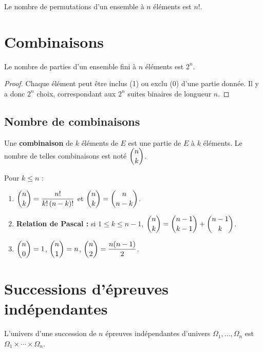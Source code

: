 \documentclass[11pt,a4paper,openany]{book}
\theoremstyle{definition}
\begin{document}
    \begin{Propriété}
        Le nombre de permutations d'un ensemble à $n$ éléments est $n!$.
    \end{Propriété}

    \section{Combinaisons}
    \begin{Propriété}
        Le nombre de parties d'un ensemble fini à $n$ éléments est $2^n$.
    \end{Propriété}
    \begin{proof}
        Chaque élément peut être inclus (1) ou exclu (0) d'une partie donnée.
        Il y a donc $2^n$ choix, correspondant aux $2^n$ suites binaires de longueur $n$.
    \end{proof}

    \subsection{Nombre de combinaisons}
    \begin{Définition}
        Une \textbf{combinaison} de $k$ éléments de $E$ est une partie de $E$ à $k$ éléments.
        Le nombre de telles combinaisons est noté $\dbinom{n}{k}$.
    \end{Définition}

    \begin{Propriété}
        Pour $k\leq n$ :
        \begin{enumerate}
            \item $\dbinom{n}{k}=\dfrac{n!}{k!\,(n-k)!}$ et $\dbinom{n}{k}=\dbinom{n}{n-k}$.
            \item \textbf{Relation de Pascal :} si $1\leq k\leq n-1$,
                  $\dbinom{n}{k}=\dbinom{n-1}{k-1}+\dbinom{n-1}{k}$.
            \item $\dbinom{n}{0}=1$, $\dbinom{n}{1}=n$, $\dbinom{n}{2}=\dfrac{n(n-1)}{2}$.
        \end{enumerate}
    \end{Propriété}

    \section{Successions d'épreuves indépendantes}
    \begin{Définition}
        L'univers d'une succession de $n$ épreuves indépendantes d'univers
        $\Omega_1,\ldots,\Omega_n$ est $\Omega_1\times\cdots\times\Omega_n$.
    \end{Définition}
\end{document}
